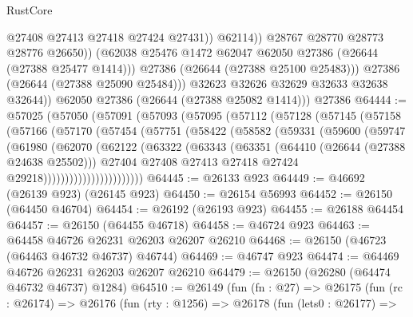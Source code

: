 \begin{lexlean}{RustCore}
\begin{coremodule}
                          @27408
                          @27413
                          @27418
                          @27424
                          @27431))
                      @62114))
                  @28767
                  @28770
                  @28773
                  @28776
                  @26650))
              (@62038 @25476 @1472 @62047 @62050 @27386 (@26644 (@27388 @25477 @1414)))
              @27386
              (@26644 (@27388 @25100 @25483)))
            @27386
            (@26644 (@27388 @25090 @25484)))
          @32623
          @32626
          @32629
          @32633
          @32638
          @32644))
      @62050
      @27386
      (@26644 (@27388 @25082 @1414)))
    @27386
@64444 := @57025
    (@57050
      (@57091
        (@57093
          (@57095
            (@57112
              (@57128
                (@57145
                  (@57158
                    (@57166
                      (@57170
                        (@57454
                          (@57751
                            (@58422
                              (@58582
                                (@59331
                                  (@59600
                                    (@59747
                                      (@61980
                                        (@62070
                                          (@62122
                                            (@63322
                                              (@63343
                                                (@63351
                                                  (@64410 (@26644 (@27388 @24638 @25502)))
                                                  @27404
                                                  @27408
                                                  @27413
                                                  @27418
                                                  @27424
                                                  @29218)))))))))))))))))))))))
@64445 := @26133 @923
@64449 := @46692 (@26139 @923) (@26145 @923)
@64450 := @26154 @56993
@64452 := @26150 (@64450 @46704)
@64454 := @26192 (@26193 @923)
@64455 := @26188 @64454
@64457 := @26150 (@64455 @46718)
@64458 := @46724 @923
@64463 := @64458 @46726 @26231 @26203 @26207 @26210
@64468 := @26150 (@46723 (@64463 @46732 @46737) @46744)
@64469 := @46747 @923
@64474 := @64469 @46726 @26231 @26203 @26207 @26210
@64479 := @26150 (@26280 (@64474 @46732 @46737) @1284)
@64510 := @26149
    (fun (fn : @27) =>
    @26175
      (fun (rc : @26174) =>
      @26176
        (fun (rty : @1256) =>
        @26178
          (fun (lets0 : @26177) =>

\end{coremodule}
\end{lexlean}
